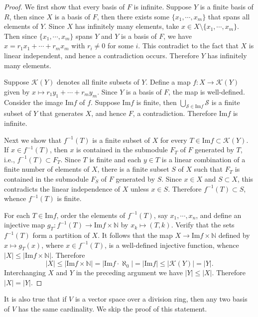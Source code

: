 \begin{proof}
We first show that every basis of $F$ is infinite. Suppose $Y$ is a finite basis of $R$, then since $X$ is a basis of $F$, then there exists some $\{x_1,\cdots,x_m\}$ that spans all elements of $Y$. Since $X$ has infinitely many elements, take $x\in X\setminus\{x_1,\cdots,x_m\}$. Then since $\{x_1,\cdots,x_m\}$ spans $Y$ and $Y$ is a basis of $F$, we have $x=r_1x_1+\cdots+r_mx_m$ with $r_i\ne 0$ for some $i$. This contradict to the fact that $X$ is linear independent, and hence a contradiction occurs. Therefore $Y$ has infinitely many elements.\par
Suppose $\mathcal{K}(Y)$ denotes all finite subsets of $Y$. Define a map $f:X\to\mathcal{K}(Y)$ given by $x\mapsto r_1y_1+\cdots+r_my_m$. Since $Y$ is a basis of $F$, the map is well-defined. Consider the image $\mathrm{Im}f$ of $f$. Suppose $\mathrm{Im}f$ is finite, then $\bigcup_{\mathcal{S}\in\mathrm{Im}f}\mathcal{S}$ is a finite subset of $Y$ that generates $X$, and hence $F$, a contradiction. Therefore $\mathrm{Im}f$ is infinite.\par
Next we show that $f^{-1}(T)$ is a finite subset of $X$ for every $T\in\mathrm{Im}f\subset\mathcal{K}(Y)$. If $x\in f^{-1}(T)$, then $x$ is contained in the submodule $F_T$ of $F$ generated by $T$, i.e., $f^{-1}(T)\subset F_T$. Since $T$ is finite and each $y\in T$ is a linear combination of a finite number of elements of $X$, there is a finite subset $S$ of $X$ such that $F_T$ is contained in the submodule $F_S$ of $F$ generated by $S$. Since $x\in X$ and $S\subset X$, this contradicts the linear independence of $X$ unless $x\in S$. Therefore $f^{-1}(T)\subset S$, whence $f^{-1}(T)$ is finite.\par
For each $T\in\mathrm{Im}f$, order the elements of $f^{-1}(T)$, say $x_1,\cdots,x_n$, and define an injective map $g_T:f^{-1}(T)\to\mathrm{Im}f\times\mathbb{N}$ by $x_k\mapsto(T,k)$. Verify that the sets $f^{-1}(T)$ form a partition of $X$. It follows that the map $X\to\mathrm{Im}f\times\mathbb{N}$ defined by $x\mapsto g_T(x)$, where $x\in f^{-1}(T)$, is a well-defined injective function, whence $|X|\le|\mathrm{Im}f\times\mathbb{N}|$. Therefore 
$$|X|\le|\mathrm{Im}f\times\mathbb{N}|=|\mathrm{Im}f\cdot\aleph_0|=|\mathrm{Im}f|\le|\mathcal{K}(Y)|=|Y|.$$
Interchanging $X$ and $Y$ in the preceding argument we have $|Y|\le|X|$. Therefore $|X|=|Y|$.
\end{proof}
It is also true that if $V$ is a vector space over a division ring, then any two basis of $V$ has the same cardinality. We skip the proof of this statement.
